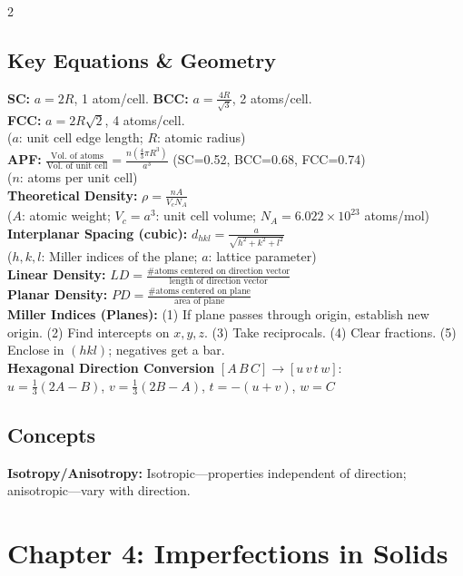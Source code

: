 \documentclass[8pt]{extarticle}
\begin{document}
\begin{multicols*}{2}
\subsection*{Key Equations \& Geometry}
\textbf{SC:} $a=2R$, 1 atom/cell. \quad \textbf{BCC:} $a=\frac{4R}{\sqrt{3}}$, 2 atoms/cell. \\
\textbf{FCC:} $a=2R\sqrt{2}$, 4 atoms/cell. \\
($a$: unit cell edge length; $R$: atomic radius) \\
\textbf{APF:} $\frac{\text{Vol. of atoms}}{\text{Vol. of unit cell}} = \frac{n(\frac{4}{3}\pi R^3)}{a^3}$ \quad (SC=0.52, BCC=0.68, FCC=0.74) \\
($n$: atoms per unit cell) \\
\textbf{Theoretical Density:} $\rho = \frac{nA}{V_c N_A}$ \\
($A$: atomic weight; $V_c=a^3$: unit cell volume; $N_A=6.022\times10^{23}$ atoms/mol) \\
\textbf{Interplanar Spacing (cubic):} $d_{hkl} = \frac{a}{\sqrt{h^2+k^2+l^2}}$ \\
($h,k,l$: Miller indices of the plane; $a$: lattice parameter) \\
\textbf{Linear Density:} $LD = \frac{\text{\# atoms centered on direction vector}}{\text{length of direction vector}}$ \\
\textbf{Planar Density:} $PD = \frac{\text{\# atoms centered on plane}}{\text{area of plane}}$ \\
\textbf{Miller Indices (Planes):} (1) If plane passes through origin, establish new origin. (2) Find intercepts on $x,y,z$. (3) Take reciprocals. (4) Clear fractions. (5) Enclose in $(hkl)$; negatives get a bar. \\
\textbf{Hexagonal Direction Conversion} $[A\,B\,C]\to[u\,v\,t\,w]$: \\
$u=\tfrac{1}{3}(2A-B)$, $v=\tfrac{1}{3}(2B-A)$, $t=-(u+v)$, $w=C$
\subsection*{Concepts}
\textbf{Isotropy/Anisotropy:} Isotropic—properties independent of direction; anisotropic—vary with direction.

\section*{Chapter 4: Imperfections in Solids}

\end{multicols*}
\end{document}
